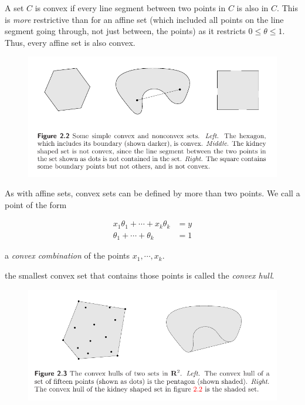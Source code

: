 \documentclass{article}
\begin{document}
A set $C$ is convex if every line segment between two points in $C$ is also in $C$.
This is {\em more\/} restrictive than for an affine set (which included all points on the line segment going through, not just between, the points) as it restricts $0 \leq \theta \leq 1$.
Thus, every affine set is also convex.

\begin{figure}[h!]
    \centering
    \includegraphics[width=1\textwidth]{./figures/ConvexSetExamples.png}
\end{figure}

As with affine sets, convex sets can be defined by more than two points.
We call a point of the form

\begin{align}
    x_1 \theta_1 + \cdots + x_k \theta_k & = y \\
    \theta_1 + \cdots + \theta_k         & = 1
\end{align}

a {\em convex combination\/} of the points $x_1, \cdots, x_k$.

the smallest convex set that contains those points is called the {\em convex hull\/}.

\begin{figure}[h!]
    \centering
    \includegraphics[width=1\textwidth]{./figures/ConvexHullExamples.png}
\end{figure}
\end{document}
